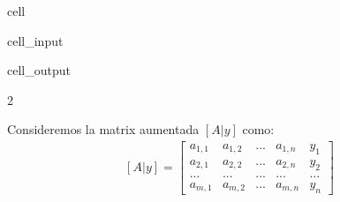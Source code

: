 \documentclass[letterpaper,10pt,english]{jupyterBook}
\begin{document}
\begin{sphinxuseclass}{cell}\begin{sphinxVerbatimInput}

\begin{sphinxuseclass}{cell_input}
\begin{sphinxVerbatim}[commandchars=\\\{\}]
   
  \PYG{p}{[}\PYG{p}{[}    \PYG{p}{]}
              \PYG{p}{[}   \PYG{p}{]}
              \PYG{p}{[}    \PYG{p}{]}\PYG{p}{]}
\end{sphinxVerbatim}

\end{sphinxuseclass}\end{sphinxVerbatimInput}
\begin{sphinxVerbatimOutput}

\begin{sphinxuseclass}{cell_output}
\begin{sphinxVerbatim}[commandchars=\\\{\}]
2
\end{sphinxVerbatim}

\end{sphinxuseclass}\end{sphinxVerbatimOutput}

\end{sphinxuseclass}
\sphinxAtStartPar
Consideremos la matrix aumentada \([A|y]\)  como:
\begin{equation*}
\begin{split}[A|y] = \begin{bmatrix}
a_{1,1} & a_{1,2} & ... & a_{1,n} & y_1\\
a_{2,1} & a_{2,2} & ... & a_{2,n} & y_2\\
... & ... & ... & ... & ...\\
a_{m,1} & a_{m,2} & ... & a_{m,n} & y_n
\end{bmatrix}\end{split}
\end{equation*}
\sphinxAtStartPar
\end{document}
